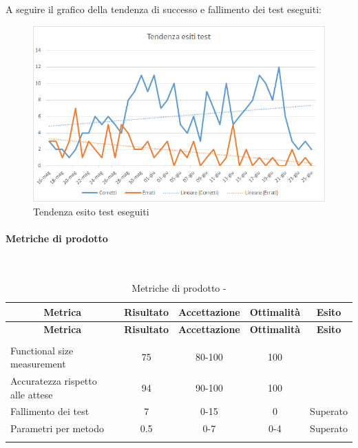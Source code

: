 A seguire il grafico della tendenza di successo e fallimento dei test eseguiti:
\begin{figure}[H]
	\centering
	\includegraphics[width=15cm]{./test.png}
	\caption{Tendenza esito test eseguiti}
\end{figure}

\paragraph{Metriche di prodotto}\mbox{}\\
\begin{longtable}{|m{5cm}|c|c|c|c|}
	\hline \multicolumn{1}{|c|}{\textbf{Metrica}} & \multicolumn{1}{c|}{\textbf{Risultato}} & \multicolumn{1}{c|}{\textbf{Accettazione}} & \multicolumn{1}{c|}{\textbf{Ottimalità}} & \multicolumn{1}{c|}{\textbf{Esito}}\\
	\hline 
	\endfirsthead
	
	\hline \multicolumn{1}{|c|}{\textbf{Metrica}} & \multicolumn{1}{c|}{\textbf{Risultato}} & \multicolumn{1}{c|}{\textbf{Accettazione}} & \multicolumn{1}{c|}{\textbf{Ottimalità}} & \multicolumn{1}{c|}{\textbf{Esito}}\\
	\hline 
	\endhead
	
	\hline \multicolumn{5}{|r|}{\ToBeContinued} \\ 
	\hline
	\endfoot
	
	\endlastfoot
	
	\hline Functional size measurement & 75 & 80-100 & 100 &  \\
	\hline Accuratezza rispetto alle attese & 94 & 90-100 & 100 & \\
	\hline Fallimento dei test & 7 & 0-15 & 0 & Superato \\
	\hline Parametri per metodo & 0.5 & 0-7 & 0-4 & Superato \\
	\hline
	\caption{Metriche di prodotto - \RA{}}
\end{longtable}